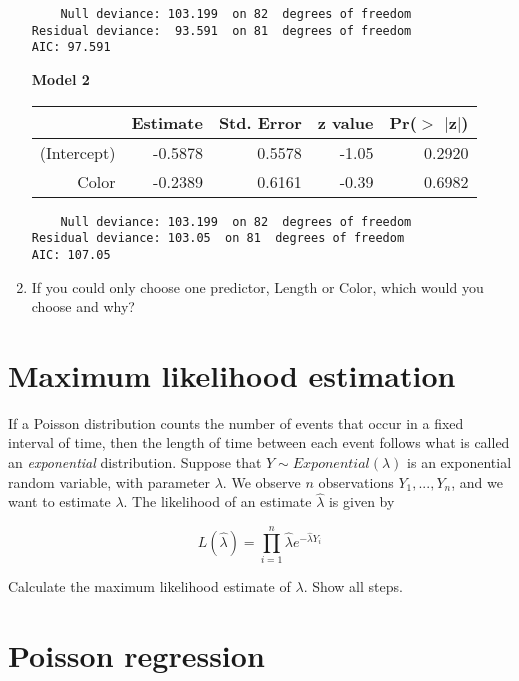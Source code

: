 \documentclass[11pt]{article}
\begin{document}
\begin{enumerate}
\begin{verbatim}
    Null deviance: 103.199  on 82  degrees of freedom
Residual deviance:  93.591  on 81  degrees of freedom
AIC: 97.591
\end{verbatim}

\textbf{Model 2}

\begin{table}[ht]
\centering
\begin{tabular}{rrrrr}
  \hline
 & Estimate & Std. Error & z value & Pr($>$ $|$z$|$) \\ 
  \hline
(Intercept) & -0.5878 & 0.5578 & -1.05 & 0.2920 \\ 
  Color & -0.2389 & 0.6161 & -0.39 & 0.6982 \\ 
   \hline
\end{tabular}
\end{table}

\begin{verbatim}
    Null deviance: 103.199  on 82  degrees of freedom
Residual deviance: 103.05  on 81  degrees of freedom
AIC: 107.05
\end{verbatim}


\item If you could only choose one predictor, Length or Color, which would you choose and why? 


\end{enumerate}  

\newpage

\section{Maximum likelihood estimation}

If a Poisson distribution counts the number of events that occur in a fixed interval of time, then the length of time between each event follows what is called an \textit{exponential} distribution. Suppose that $Y \sim Exponential(\lambda)$ is an exponential random variable, with parameter $\lambda$. We observe $n$ observations $Y_1,...,Y_n$, and we want to estimate $\lambda$. The likelihood of an estimate $\widehat{\lambda}$ is given by

$$L(\widehat{\lambda}) = \prod \limits_{i=1}^n \widehat{\lambda} e^{- \widehat{\lambda} Y_i}$$

Calculate the maximum likelihood estimate of $\lambda$. Show all steps.



\newpage

\section{Poisson regression}
\end{document}
